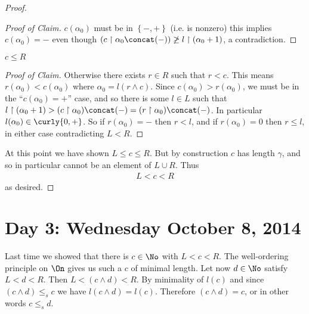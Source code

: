 \begin{proof}
\begin{proof}[Proof of Claim]
		$c(\alpha_0)$ must be in $\left\{ -, + \right\}$ (i.e. 
		is nonzero) this implies $c(\alpha_0) = -$ even though 
		$(c \restriction \alpha_0 \concat (-)) \not \geq 
		l \restriction (\alpha_0 + 1)$, a contradiction. 
	\end{proof}
	\begin{claim}
		$c \leq R$	
	\end{claim}
	\begin{proof}[Proof of Claim]
		Otherwise there exists $r \in R$ such that 
		$r < c$. This means $r(\alpha_0) < c(\alpha_0)$ 
		where $\alpha_0 = l(r \land c)$. 
		Since $c(\alpha_0) > r(\alpha_0)$, 
		we must be in the ``$c(\alpha_0) = +$'' case, and so 
		there is some $l \in L$ such that 
		$l \restriction (\alpha_0 + 1) > (c \restriction \alpha_0) 
		\concat (-) = (r \restriction \alpha_0) \concat (-)$. 
		In particular $l(\alpha_0) \in \curly{0, +}$. 
		So if $r(\alpha_0) = -$ then $r < l$, and if 
		$r(\alpha_0) = 0$ then $r \leq l$, in either 
		case contradicting $L < R$. 
	\end{proof}
	At this point we have shown $L \leq c \leq R$. 
	But by construction $c$ has length $\gamma$, and so 
	in particular cannot be an element of $L \cup R$. 
	Thus 
	\begin{align*}
		L < c < R
	\end{align*}
	as desired. 
\end{proof}

\section*{Day 3: Wednesday October 8, 2014}
Last time we showed that there is $c \in \No$ with $L < c < R$. 
The well-ordering principle on $\On$ gives us such a $c$ of minimal 
length. Let now $d \in \No$ satisfy $L < d < R$. Then 
$L < (c \wedge d) < R$. By minimality of $l(c)$ and since 
$(c \wedge d) \leq_s c$ we have $l(c \wedge d) = l(c)$. 
Therefore $(c \wedge d) = c$, or in other words $c \leq_s d$. 

